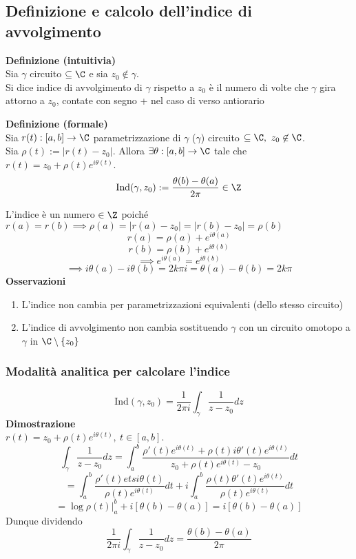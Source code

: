 \subsection{Definizione e calcolo dell'indice di avvolgimento}
\begin{tcolorbox}
	\textbf{Definizione (intuitivia)}
	\\Sia $\gamma$ circuito $\subseteq \C$ e sia $z_0 \not\in \gamma$.
	\\Si dice indice di avvolgimento di $\gamma$ rispetto a $z_0$ è il numero di volte che $\gamma$ gira attorno a $z_0$, contate con segno + nel caso di verso antiorario
\end{tcolorbox}
\begin{tcolorbox}
	\textbf{Definizione (formale)} \\
	Sia $r(t):[a,b]\to \C$ parametrizzazione di $\gamma$ ($\gamma$) circuito $\subseteq \C,\ z_0 \not\in \C $.
	\\Sia $\rho (t):=|r(t)-z_0|$. Allora $\exists \theta:[a,b]\to \C$ tale che $r(t)=z_0+\rho(t)e^{i\theta(t)}$.
	\[\text{Ind}(\gamma,z_0):= \frac{\theta(b)-\theta(a)}{2\pi}\in\Z\]
\end{tcolorbox}
L'indice è un numero $\in\Z$ poiché $r(a)=r(b)\implies\rho(a)=|r(a)-z_0|=|r(b)-z_0|=\rho(b)$
\[r(a)=\rho (a)+e^{i\theta(a)}\]
\[r(b)=\rho(b)+e^{i\theta(b)}\]
\[\implies e^{i\theta(a)}=e^{i\theta(b)}\]
\[\implies i\theta(a)-i\theta(b)=2k\pi i = \theta(a)-\theta(b)=2k \pi\]
\textbf{Osservazioni}
\begin{enumerate}
	\item L'indice non cambia per parametrizzazioni equivalenti (dello stesso circuito)
	\item L'indice di avvolgimento non cambia sostituendo $\gamma$ con un circuito omotopo a $\gamma$ in $\C\setminus \{z_0\} $
\end{enumerate}
\subsubsection{Modalità analitica per calcolare l'indice}
\[\text{Ind}(\gamma, z_0)=\frac{1}{2\pi i} \int_{\gamma}^{} \frac{1}{z-z_0}dz\]
\textbf{Dimostrazione} 
\\$r(t)=z_0+\rho(t)e^{i\theta(t)},\ t\in[a,b]$.
\[\int_{\gamma}^{} \frac{1}{z-z_0}dz=\int_{a}^{b} \frac{\rho'(t)e^{i\theta(t)}+\rho(t)i\theta'(t)e^{i\theta(t)}}{z_0+\rho(t)e^{i\theta(t)}-z_0}dt\]
\[=\int_{a}^{b} \frac{\rho'(t)etsi\theta(t)}{\rho(t)e^{i\theta(t)}}dt+i \int_{a}^{ b} \frac{\rho(t)\theta'(t)e^{i\theta(t)}}{\rho(t) e^{i\theta(t)}}dt\]
\[=\log\rho(t)|_a^b+i[\theta(b)-\theta(a)]=i[\theta(b)-\theta(a)]\]
Dunque dividendo
\[\frac{1}{2\pi i}\int_{\gamma}^{} \frac{1}{z-z_0}dz=\frac{\theta(b)-\theta(a)}{2\pi}\]
